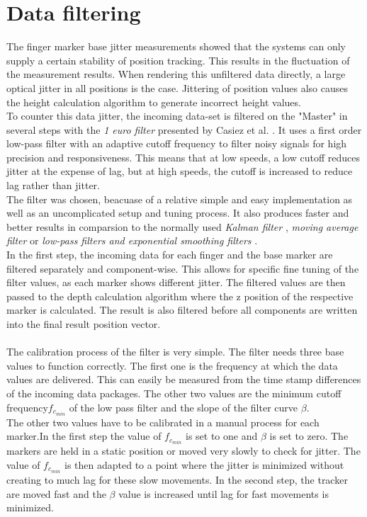\section{Data filtering}
The finger marker base jitter measurements showed that the systems can only supply a certain stability of position tracking. This results in the fluctuation of the measurement results. When rendering this unfiltered data directly, a large optical jitter in all positions is the case. Jittering of position values also causes the height calculation algorithm to generate incorrect height values.\\
To counter this data jitter, the incoming data-set is filtered on the "Master" in several steps with the \textit{1 euro filter} presented by Casiez et al. \cite{Casiez.2012}. It uses a first order low-pass filter with an adaptive cutoff frequency to filter noisy signals for high precision and responsiveness. This means that at low speeds, a low cutoff reduces jitter at the expense of lag, but at high speeds, the cutoff is increased to reduce lag rather than jitter.\\
\newpage The filter was chosen, beacuase of a relative simple and easy implementation as well as an uncomplicated setup and tuning process. It also produces faster and better results in comparsion to the normally used \textit{Kalman filter} \cite{Welch.2001}, \textit{moving average filter} or \textit{low-pass filters and exponential smoothing filters} \cite{LaViola.2003}.
\\ In the first step, the incoming data for each finger and the base marker  are filtered separately and component-wise. This allows for specific fine tuning of the filter values, as each marker shows different jitter. The filtered values are then passed to the depth calculation algorithm where the z position of the respective marker is calculated. The result is also filtered before all components are written into the final result position vector.
\\\\The calibration process of the filter is very simple. The filter needs three base values to function correctly. The first one is the frequency at which the data values are delivered. This can easily be measured from the time stamp differences of the incoming data packages. The other two values are the minimum cutoff frequency$f_{c_{min}} $ of the low pass filter and the slope of the filter curve $\beta$.
\\The other two values have to be calibrated in a manual process for each marker.In the first step the value of $f_{c_{min}} $ is set to one and $\beta$ is set to zero. The markers are held in a static position or moved very slowly to check for jitter. The value of $f_{c_{min}} $ is then adapted to a point where the jitter is minimized without creating to much lag for these slow movements. In the second step, the tracker are moved fast and the $\beta$ value is increased until lag for fast movements is minimized.
